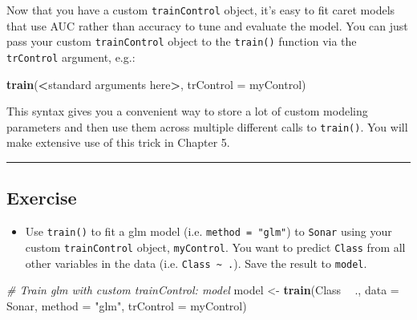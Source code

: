 \documentclass[]{book}
\newenvironment{Shaded}{\begin{snugshade}}{\end{snugshade}}
\newcommand{\KeywordTok}[1]{\textcolor[rgb]{0.13,0.29,0.53}{\textbf{#1}}}
\newcommand{\DataTypeTok}[1]{\textcolor[rgb]{0.13,0.29,0.53}{#1}}
\newcommand{\StringTok}[1]{\textcolor[rgb]{0.31,0.60,0.02}{#1}}
\newcommand{\CommentTok}[1]{\textcolor[rgb]{0.56,0.35,0.01}{\textit{#1}}}
\newcommand{\OperatorTok}[1]{\textcolor[rgb]{0.81,0.36,0.00}{\textbf{#1}}}
\newcommand{\NormalTok}[1]{#1}
\providecommand{\tightlist}{%
  \setlength{\itemsep}{0pt}\setlength{\parskip}{0pt}}
\begin{document}
Now that you have a custom \texttt{trainControl} object, it's easy to
fit caret models that use AUC rather than accuracy to tune and evaluate
the model. You can just pass your custom \texttt{trainControl} object to
the \texttt{train()} function via the \texttt{trControl} argument, e.g.:

\begin{Shaded}
\begin{Highlighting}[]
\KeywordTok{train}\NormalTok{(}\OperatorTok{<}\NormalTok{standard arguments here}\OperatorTok{>}\NormalTok{, }\DataTypeTok{trControl =}\NormalTok{ myControl)}
\end{Highlighting}
\end{Shaded}

This syntax gives you a convenient way to store a lot of custom modeling
parameters and then use them across multiple different calls to
\texttt{train()}. You will make extensive use of this trick in Chapter
5.

\begin{center}\rule{0.5\linewidth}{\linethickness}\end{center}

\subsection*{Exercise}\label{exercise-16}

\begin{itemize}
\tightlist
\item
  Use \texttt{train()} to fit a glm model (i.e.
  \texttt{method\ =\ "glm"}) to \texttt{Sonar} using your custom
  \texttt{trainControl} object, \texttt{myControl}. You want to predict
  \texttt{Class} from all other variables in the data (i.e.
  \texttt{Class\ \textasciitilde{}\ .}). Save the result to
  \texttt{model}.
\end{itemize}

\begin{Shaded}
\begin{Highlighting}[]
\CommentTok{# Train glm with custom trainControl: model}
\NormalTok{model <-}\StringTok{ }\KeywordTok{train}\NormalTok{(Class }\OperatorTok{~}\StringTok{ }\NormalTok{., }\DataTypeTok{data =}\NormalTok{ Sonar, }
               \DataTypeTok{method =} \StringTok{"glm"}\NormalTok{, }
               \DataTypeTok{trControl =}\NormalTok{ myControl)}
\end{Highlighting}
\end{Shaded}
\end{document}
